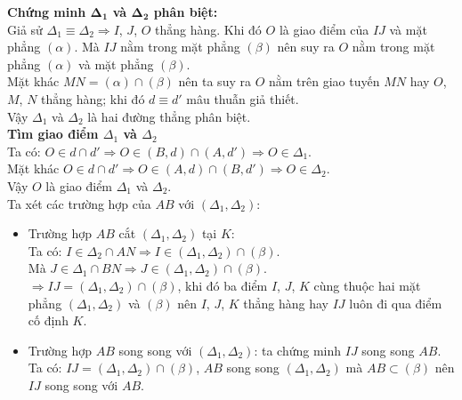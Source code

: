 \begin{bt}
{\begin{enumerate}[d)]
											\textbf{Chứng minh $\mathbf{\Delta_1}$ và $\mathbf{\Delta_2}$ phân biệt:}\\
											Giả sử $\Delta_1 \equiv \Delta_2 \Rightarrow I$, $J$, $O$ thẳng hàng. Khi đó $O$ là giao điểm của $IJ$ và mặt phẳng $(\alpha)$. Mà $IJ$ nằm trong mặt phẳng $(\beta)$ nên suy ra $O$ nằm trong mặt phẳng $(\alpha)$ và mặt phẳng $(\beta)$.
											\\
											Mặt khác $MN = (\alpha) \cap (\beta)$ nên ta suy ra $O$ nằm trên giao tuyến $MN$ hay $O$, $M$, $N$ thẳng hàng; khi đó $d \equiv d'$  mâu thuẫn giả thiết.\\
											Vậy $\Delta_1$ và $\Delta_2$ là hai đường thẳng phân biệt.\\
											\textbf{Tìm giao điểm $\Delta_1$ và $\Delta_2$}\\
											Ta có: $O \in d \cap d' \Rightarrow O \in (B,d) \cap (A,d')\Rightarrow O \in \Delta_1$.\\
											Mặt khác $O \in d \cap d'\Rightarrow O \in (A,d) \cap (B,d')\Rightarrow O \in \Delta_2$.\\
											Vậy $O$ là giao điểm $\Delta_1$ và $\Delta_2$.\\
											Ta xét các trường hợp của $AB$ với $\left(\Delta_1,\Delta_2\right)$:
											\begin{itemize}
												\item Trường hợp $AB$ cắt $\left(\Delta_1,\Delta_2\right)$ tại $K$: \\
												Ta có: $I \in \Delta_2 \cap AN \Rightarrow I \in \left(\Delta_1,\Delta_2\right) \cap (\beta)$.\\
												Mà $J \in \Delta_1 \cap BN \Rightarrow J \in \left(\Delta_1,\Delta_2\right) \cap (\beta)$.\\ 
												$\Rightarrow IJ = \left(\Delta_1,\Delta_2\right) \cap (\beta)$, khi đó ba điểm $I$, $J$, $K$ cùng thuộc hai mặt phẳng $\left(\Delta_1,\Delta_2\right)$ và $(\beta)$ nên $I$, $J$, $K$ thẳng hàng hay $IJ$ luôn đi qua điểm cố định $K$. 
												\item Trường hợp $AB$ song song với $\left(\Delta_1,\Delta_2\right)$: ta chứng minh $IJ$ song song $AB$.\\
												Ta có: $IJ = \left(\Delta_1,\Delta_2\right) \cap (\beta)$, $AB$ song song $\left(\Delta_1,\Delta_2\right)$ mà $AB \subset (\beta)$ nên $IJ$ song song với $AB$.
											\end{itemize}
										\end{enumerate}}
									\end{bt}